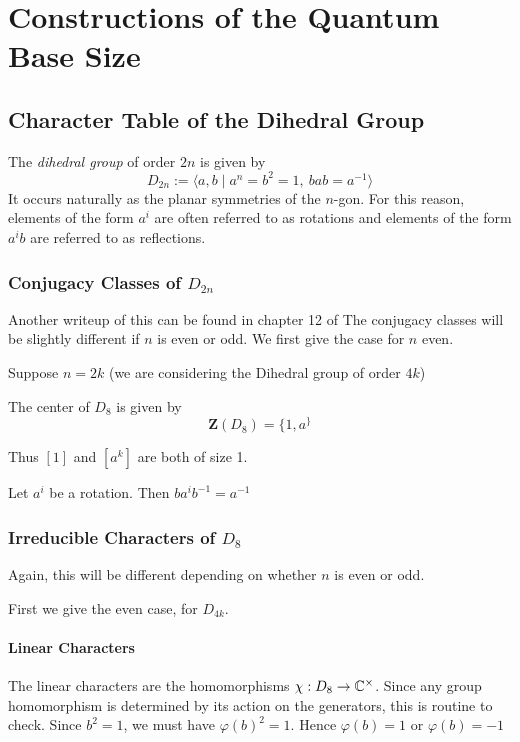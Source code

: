 

\chapter{Constructions of the Quantum Base Size}





\section{Character Table of the Dihedral Group}


The \emph{dihedral group} of order $2n$ is given by
\[
    D_{2n} := \langle a,b \mid a^n = b^2 = 1,\ bab = a^{-1} \rangle
\]
It occurs naturally as the planar symmetries of the $n$-gon. For this reason, elements of the form $a^i$ are often 
referred to as rotations and elements of the form $a^ib$ are referred to as reflections.


\subsection{Conjugacy Classes of $D_{2n}$}

Another writeup of this can be found in chapter 12 of \cite{James&Liebeck}
The conjugacy classes will be slightly different if $n$ is even or odd. We first give the case for $n$ even. 

Suppose $n = 2k$ (we are considering the Dihedral group of order $4k$)

The center of $D_8$ is given by
\[
    \mathbf{Z}(D_8) = \{1, a^\}
\]

Thus $[1]$ and $[a^k]$ are both of size 1.


Let $a^i$ be a rotation. Then $ba^ib^{-1} = a^{-1}$



\subsection{Irreducible Characters of $D_8$}

Again, this will be different depending on whether $n$ is even or odd. 

First we give the even case, for $D_{4k}$.

\subsubsection{Linear Characters}
The linear characters are the homomorphisms $\chi : D_8 \rightarrow \mathbb{C}^\times$. Since any group homomorphism is 
determined by its action on the generators, this is routine to check. Since $b^2 = 1$, we must have $\varphi(b)^2 = 
1$. Hence $\varphi(b) = 1$ or $\varphi(b) = -1$ 

